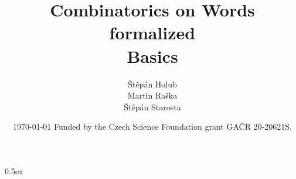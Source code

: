 \documentclass[11pt,a4paper]{report}
\begin{document}
\title{Combinatorics on Words formalized \\ Basics}
\author{Štěpán Holub \\ Martin Raška \\ Štěpán Starosta }
  

 \date{ \today
 \vfill
  Funded by the Czech Science Foundation grant GA\v CR 20-20621S.}
  
\maketitle


\tableofcontents
\vspace{\baselineskip}

\parindent 0pt\parskip 0.5ex



\cleardoublepage
{}
{}
\renewcommand{\bibname}{References}


\end{document}
